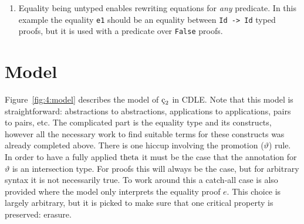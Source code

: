 \begin{enumerate}
    \item {
        Equality being untyped enables rewriting equations for \textit{any} predicate.
        In this example the equality \texttt{e1} should be an equality between \texttt{Id -> Id} typed proofs, but it is used with a predicate over \texttt{False} proofs.
    }

\end{enumerate}


\section{Model}

Figure~\ref{fig:4:model} describes the model of $\ced$ in CDLE.
Note that this model is straightforward: abstractions to abstractions, applications to applications, pairs to pairs, etc.
The complicated part is the equality type and its constructs, however all the necessary work to find suitable terms for these constructs was already completed above.
There is one hiccup involving the promotion ($\vartheta$) rule.
In order to have a fully applied $\textnormal{theta}$ it must be the case that the annotation for $\vartheta$ is an intersection type.
For proofs this will always be the case, but for arbitrary syntax it is not necessarily true.
To work around this a catch-all case is also provided where the model only interprets the equality proof $e$.
This choice is largely arbitrary, but it is picked to make sure that one critical property is preserved: erasure.



